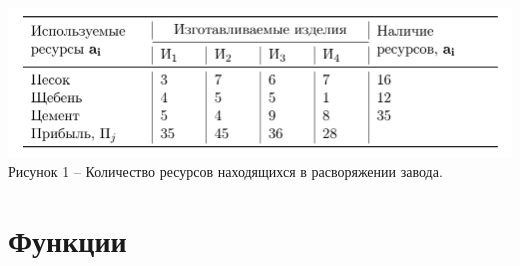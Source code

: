 \documentclass[russian, utf8, nocolumnxxxi, nocolumnxxxii, 14pt]{eskdtext}
\begin{document}
\begin{center} \includegraphics[scale=0.4]{JPG/ein.png}\\
Рисунок 1 -- Количество ресурсов находящихся в расворяжении завода.\\
\end{center}
\newpage
\section{Функции}
\end{document}
